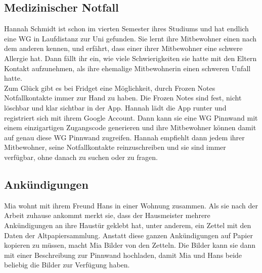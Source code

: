 \documentclass[a4paper]{scrreprt}
\begin{document}
        \subsection{Medizinischer Notfall}
        Hannah Schmidt ist schon im vierten Semester ihres Studiums und hat endlich eine WG in Laufdistanz zur Uni gefunden. Sie lernt ihre Mitbewohner einen nach dem anderen kennen, und erfährt, dass einer ihrer Mitbewohner eine schwere Allergie hat. Dann fällt ihr ein, wie viele Schwierigkeiten sie hatte mit den Eltern Kontakt aufzunehmen, als ihre ehemalige Mitbewohnerin einen schweren Unfall hatte.\\
        Zum Glück gibt es bei Fridget eine Möglichkeit, durch Frozen Notes Notfallkontakte immer zur Hand zu haben. Die Frozen Notes sind fest, nicht löschbar und klar sichtbar in der App. Hannah lädt die App runter und registriert sich mit ihrem Google Account. Dann kann sie eine WG Pinnwand mit einem einzigartigen Zugangscode generieren und ihre Mitbewohner können damit auf genau diese WG Pinnwand zugreifen. Hannah empfiehlt dann jedem ihrer Mitbewohner, seine Notfallkontakte reinzuschreiben und sie sind immer verfügbar, ohne danach zu suchen oder zu fragen.
        \newpage
        
        \subsection{Ankündigungen}
        Mia wohnt mit ihrem Freund Hans in einer Wohnung zusammen. Als sie nach der Arbeit zuhause ankommt merkt sie, dass der Hausmeister mehrere Ankündigungen an ihre Haustür geklebt hat, unter anderem, ein Zettel mit den Daten der Altpapiersammlung.
        Anstatt diese ganzen Ankündigungen auf Papier kopieren zu müssen, macht Mia Bilder von den Zetteln. Die Bilder kann sie dann mit einer Beschreibung zur Pinnwand hochladen, damit Mia und Hans beide beliebig die Bilder zur Verfügung haben.
        

        \newpage
\end{document}

